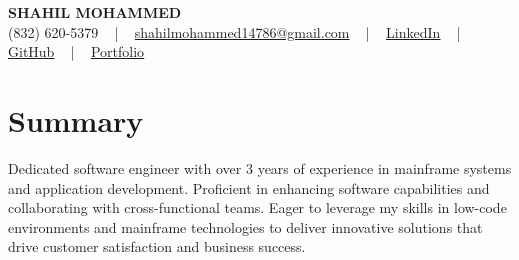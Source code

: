 \documentclass[letterpaper,10pt]{article}
\begin{document}
\begin{center}
    {\fontsize{14pt}{12pt}\selectfont \textbf{\MakeUppercase{Shahil Mohammed}}}\\ \vspace{2pt}
    \fontsize{10pt}{12pt}\selectfont (832) 620-5379 ~ | ~ \href{mailto:shahilmohammed14786@gmail.com}{shahilmohammed14786@gmail.com} ~ | ~  
    \href{https://www.linkedin.com/in/shahil-mohammed-9652931a1/}{\color{blue}\underline{LinkedIn}}  ~ | ~ 
    \href{https://github.com/freakbeast14}{\color{blue}\underline{GitHub}} ~ | ~ 
    \href{https://shahil-mohammed.netlify.app/}{\color{blue}\underline{Portfolio}}
    \vspace{-8pt}
\end{center}

\section{Summary}
\vspace{-2pt}\fontsize{8pt}{9pt}\selectfont
Dedicated software engineer with over 3 years of experience in mainframe systems and application development. Proficient in enhancing software capabilities and collaborating with cross-functional teams. Eager to leverage my skills in low-code environments and mainframe technologies to deliver innovative solutions that drive customer satisfaction and business success. 
 \vspace{-5pt}
 
\vspace{-2pt}
\end{document}
